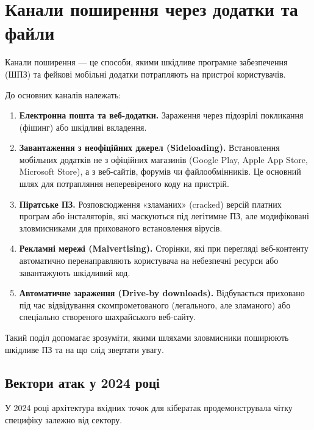 \section{Канали поширення через додатки та файли}

Канали поширення — це способи, якими шкідливе програмне забезпечення (ШПЗ) та фейкові мобільні додатки потрапляють на пристрої користувачів.

\newpage

До основних каналів належать:

\begin{enumerate}
    \item \textbf{Електронна пошта та веб-додатки.}
    Зараження через підозрілі покликання (фішинг) або шкідливі вкладення.

    \item \textbf{Завантаження з неофіційних джерел (Sideloading).}
    Встановлення мобільних додатків не з офіційних магазинів (Google Play, Apple App Store, Microsoft Store), а з веб-сайтів, форумів чи файлообмінників. Це основний шлях для потрапляння неперевіреного коду на пристрій.

    \item \textbf{Піратське ПЗ.}
    Розповсюдження «зламаних» (cracked) версій платних програм або інсталяторів, які маскуються під легітимне ПЗ, але модифіковані зловмисниками для прихованого встановлення вірусів.

    \item \textbf{Рекламні мережі (Malvertising).}
    Сторінки, які при перегляді веб-контенту автоматично перенаправляють користувача на небезпечні ресурси або завантажують шкідливий код.

    \item \textbf{Автоматичне зараження (Drive-by downloads).}
    Відбувається приховано під час відвідування скомпрометованого (легального, але зламаного) або спеціально створеного шахрайського веб-сайту.
\end{enumerate}

Такий поділ допомагає зрозуміти, якими шляхами зловмисники поширюють шкідливе ПЗ та на що слід звертати увагу.

\subsection*{Вектори атак у 2024 році}

У 2024 році архітектура вхідних точок для кібератак продемонструвала чітку специфіку залежно від сектору.

